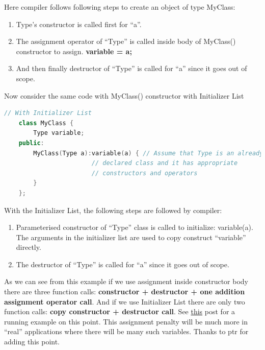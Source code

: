 \documentclass[12pt , a4paper]{article}
\newcommand{\hl}[1]{\colorbox{coolblack}{\color{cream}\textbf{#1}\color{black}}}
\begin{document}
Here compiler follows following steps to create an object of type MyClass:
	\begin{enumerate}
		\item Type’s constructor is called first for “a”. \\
		\item The assignment operator of “Type” is called inside body of MyClass() constructor to assign. \hl{variable = a;}\\
		\item And then finally destructor of “Type” is called for “a” since it goes out of scope.\\
	\end{enumerate}
Now consider the same code with MyClass() constructor with Initializer List 
	\begin{lstlisting}[language=C++]
	// With Initializer List
	class MyClass {
		Type variable;
	public:
		MyClass(Type a):variable(a) { // Assume that Type is an already
						// declared class and it has appropriate
						// constructors and operators
		}
	};
	\end{lstlisting}
With the Initializer List, the following steps are followed by compiler: 
	\begin{enumerate}
		\item Parameterised constructor of “Type” class is called to initialize: variable(a). The arguments in the initializer list are used to copy construct “variable” directly.  \\
		\item The destructor of “Type” is called for “a” since it goes out of scope.\\
	\end{enumerate}
As we can see from this example if we use assignment inside constructor body there are three function calls: \textbf{constructor + destructor + one addition assignment operator call}. And if we use Initializer List there are only two function calls: \textbf{copy constructor + destructor call}. See \href{https://www.geeksforgeeks.org/output-of-c-program/}{this} post for a running example on this point.
This assignment penalty will be much more in “real” applications where there will be many such variables. Thanks to ptr for adding this point. 
\end{document}
